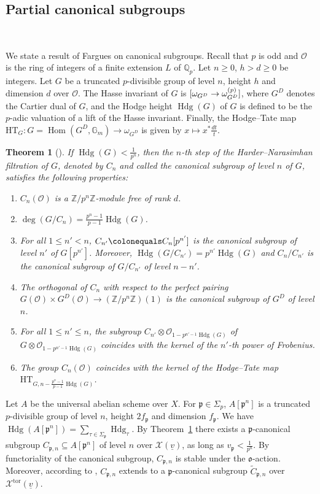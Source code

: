\documentclass[11pt]{amsart}
\theoremstyle{definition} %
\theoremstyle{plain} %
\newtheorem{theorem}[definition]{Theorem}
\theoremstyle{remark} %
\newcommand{\QQ}{{\mathbb Q}}
\newcommand{\ZZ}{{\mathbb Z}}
\newcommand{\cO}{{\mathcal O}}
\newcommand{\cX}{{\mathcal X}}
\newcommand{\frako}{\mathfrak o}
\newcommand{\frakp}{\mathfrak p}
\newcommand{\HT}{\mathrm{HT}}
\newcommand{\defeq}{\colonequals} %
\DeclareMathOperator\Hom{Hom} %
\newcommand{\Gm}{\mathbb{G}_m} %
\newcommand{\tor}{\mathrm{tor}} %
\let\det\relax
\DeclareMathOperator{\det}{det} %
\DeclareMathOperator{\Hdg}{Hdg}
\begin{document}
\subsection{Partial canonical subgroups} \

We state a result of Fargues on canonical subgroups. 
Recall that $p$ is odd and $\cO$ is the ring of integers of a finite extension $L$ of $\QQ_p$.
Let $n\geqslant 0$, $h>d\geqslant 0$ be integers. 
Let $G$ be a truncated $p$-divisible group of level $n$, height $h$ and dimension $d$ over $\cO$.
The Hasse invariant of $G$ is $\det[\omega_{G^D} \rightarrow \omega_{G^D}^{(p)}]$,
where $G^D$ denotes the Cartier dual of $G$, and the Hodge height $\Hdg(G)$ of $G$ is defined to be the $p$-adic valuation of a lift of the Hasse invariant. Finally, the Hodge--Tate map $\HT_G\colon G=\Hom(G^D,\Gm) \rightarrow \omega_{G^D}$ is given by $x\mapsto x^\ast \frac{dt}{t}$. 


\begin{theorem}[{\cite[TH\'EOR\`EME~6]{Fargue_Can}}] \label{thm:Fargues}
 If $\Hdg(G)<\frac{1}{p^n}$, then the $n$-th step of the Harder--Narasimhan filtration of $G$, denoted by $C_n$ and called the canonical subgroup of level $n$ of $G$,  satisfies the following properties: 
\begin{enumerate}
 \item $C_n(\cO)$ is a $\ZZ/p^n\ZZ$-module free of rank $d$.
 \item $\deg(G/C_n) = \frac{p^n-1}{p-1}\Hdg (G)$. 
 \item For all $1\leqslant n'<n$, $C_{n'}\defeq C_n[p^{n'}]$ is the canonical subgroup of level $n'$ of $G[p^{n'}]$. Moreover, $\Hdg(G/C_{n'}) = p^{n'} \Hdg(G)$ and $C_n/C_{n'}$ is the canonical subgroup of $G/C_{n'}$ of level $n-n'$.
 \item  The orthogonal of $C_n$ with respect to the perfect pairing $G(\cO)\times G^D(\cO) \rightarrow (\ZZ/p^n\ZZ)(1)$ is the canonical subgroup of $G^D$ of level $n$.
 \item For all $1\leqslant n'\leqslant n$, the subgroup 
 $C_{n'}\otimes\cO_{1-p^{n'-1}\Hdg(G)}$ of $G\otimes \cO_{1-p^{n'-1}\Hdg(G)}$ coincides with the kernel of the $n'$-th power of Frobenius.
 \item The group $C_n(\cO)$ coincides with the kernel of the Hodge--Tate map $\HT_{G, n-\frac{p^n-1}{p-1}\Hdg(G)}$. 
 \end{enumerate}
\end{theorem}

 
Let $A$ be the universal abelian scheme over $X$.  
For  $\frakp\in\Sigma_p$,  $A[\frakp^n]$ is a truncated $p$-divisible group of level $n$, height $2f_\frakp$ and dimension $f_\frakp$. We have $\Hdg(A[\frakp^n])=\sum_{\tau\in\Sigma_{\frakp}} \Hdg_\tau$. 
By  Theorem~\ref{thm:Fargues}  there exists a $\frakp$-canonical subgroup $C_{\frakp,n}\subseteq A[\frakp^n]$ of level $n$ over  $\cX(\underline{v})$, as long as $v_\frakp<\frac1{p^n}$. By functoriality of the canonical subgroup, $C_{\frakp,n}$ is stable under the $\frako$-action. Moreover, according to \cite[\S4.1]{AIP_Siegel}, $C_{\frakp,n}$ extends  to a  
$\frakp$-canonical subgroup $\widetilde{C}_{\frakp,n}$ over $\cX^\tor(\underline{v})$.
\end{document}
